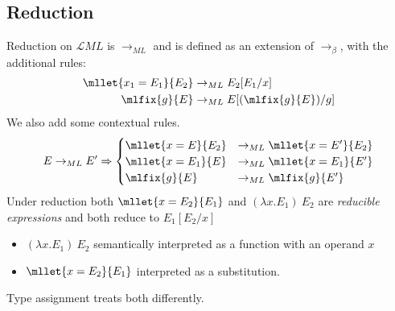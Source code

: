 \subsection{Reduction}
Reduction on $\mathcal{L}{ML}$ is $\to_{ML}$ and is defined as an extension of $\to_\beta$, with the additional rules:
\[\begin{split}
		\mllet{x_1 = E_1}{E_2} & \to_{ML} E_2[E_1/x] \\
		\mlfix{g}{E} & \to_{ML} E[(\mlfix{g}{E})/g] \\
	\end{split}\]
We also add some contextual rules.
\[E \to_{ML} E' \Rightarrow \begin{cases}
		\mllet{x = E}{E_2} & \to_{ML} \mllet{x = E'}{E_2} \\
		\mllet{x = E_1}{E} & \to_{ML} \mllet{x = E_1}{E'} \\
		\mlfix{g}{E}       & \to_{ML} \mlfix{g}{E'}       \\
	\end{cases}\]
Under reduction both $\mllet{x = E_2}{E_1}$ and $(\lambda x . E_1) \ E_2$ are \textit{reducible expressions} and both reduce to $E_1[E_2/x]$
\begin{itemize}
	\item $(\lambda x . E_1) \ E_2$ semantically interpreted as a function with an operand $x$
	\item $\mllet{x = E_2}{E_1}$ interpreted as a substitution.
\end{itemize}
Type assignment treats both differently.

